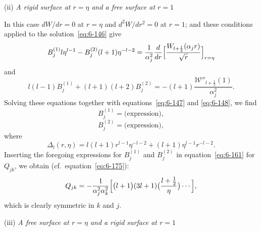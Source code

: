 \medskip
\noindent (ii) \emph{A rigid surface at $r = \eta$ and a free surface at $r = 1$}

In this case $dW/dr = 0$ at $r = \eta$ and $d^2W/dr^2 = 0$ at $r = 1$; and these
conditions applied to the solution~\eqref{eq:6-146} give
\begin{equation}\label{eq:6-167}
B_j^{(1)} l\eta^{l-1} - B_j^{(2)}(l+1)\eta^{-l-2} = \frac{1}{\alpha_j^2}\frac{d}{dr}\Bigl[\frac{\mathscr{W}_{l+\frac{1}{2}}(\alpha_j r)}{\sqrt{r}}\Bigr]_{r=\eta}
\end{equation}
and
\begin{equation}\label{eq:6-168}
l(l-1)B_j^{(1)} + (l+1)(l+2)B_j^{(2)} = -(l+1)\frac{\mathscr{W}''_{l+\frac{1}{2}}(1)}{\alpha_j^2}.
\end{equation}
Solving these equations together with equations~\eqref{eq:6-147} and \eqref{eq:6-148}, we find
\begin{equation}\label{eq:6-169}
B_j^{(1)} = \text{(expression)},
\end{equation}
\begin{equation}\label{eq:6-170}
B_j^{(2)} = \text{(expression)},
\end{equation}
where
\begin{equation}\label{eq:6-171}
\Delta_l(r,\eta) = l(l+1)r^{l-1}\eta^{-l-2} + (l+1)\eta^{l-1}r^{-l-2}.
\end{equation}
Inserting the foregoing expressions for $B_j^{(1)}$ and $B_j^{(2)}$ in equation~\eqref{eq:6-161} for
$Q_{jk}$, we obtain (cf.\ equation~\eqref{eq:6-175}):
\begin{equation}\label{eq:6-172}
Q_{jk} = -\frac{1}{\alpha_j^2\alpha_k^2}\Bigl[\bigl(l+1\bigr)(3l+1)\bigl(\frac{l+\frac{1}{2}}{\eta}\bigr) \cdots\Bigr],
\end{equation}
which is clearly symmetric in $k$ and $j$.

\medskip
\noindent (iii) \emph{A free surface at $r = \eta$ and a rigid surface at $r = 1$}

